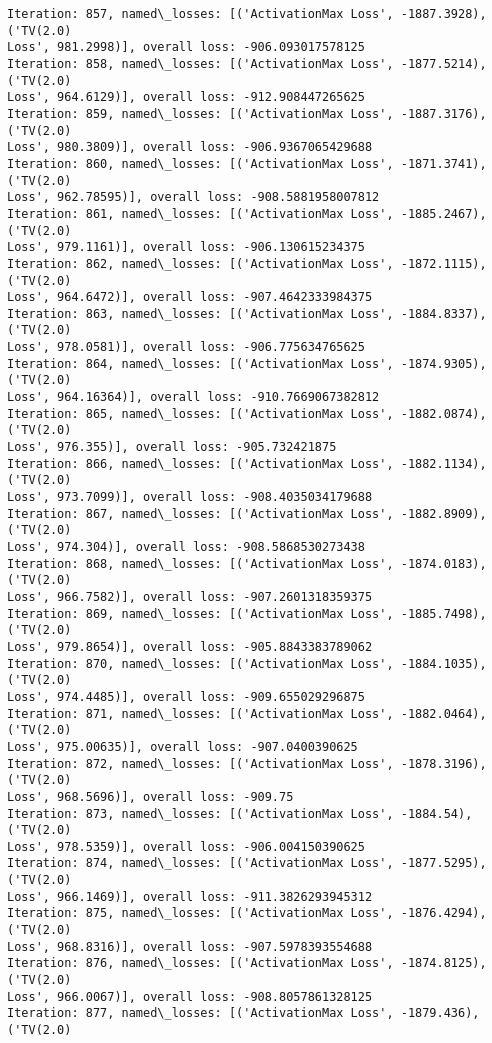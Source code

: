 \documentclass[10pt]{article}
\begin{document}
\begin{Verbatim}[commandchars=\\\{\}]
Iteration: 857, named\_losses: [('ActivationMax Loss', -1887.3928), ('TV(2.0)
Loss', 981.2998)], overall loss: -906.093017578125
Iteration: 858, named\_losses: [('ActivationMax Loss', -1877.5214), ('TV(2.0)
Loss', 964.6129)], overall loss: -912.908447265625
Iteration: 859, named\_losses: [('ActivationMax Loss', -1887.3176), ('TV(2.0)
Loss', 980.3809)], overall loss: -906.9367065429688
Iteration: 860, named\_losses: [('ActivationMax Loss', -1871.3741), ('TV(2.0)
Loss', 962.78595)], overall loss: -908.5881958007812
Iteration: 861, named\_losses: [('ActivationMax Loss', -1885.2467), ('TV(2.0)
Loss', 979.1161)], overall loss: -906.130615234375
Iteration: 862, named\_losses: [('ActivationMax Loss', -1872.1115), ('TV(2.0)
Loss', 964.6472)], overall loss: -907.4642333984375
Iteration: 863, named\_losses: [('ActivationMax Loss', -1884.8337), ('TV(2.0)
Loss', 978.0581)], overall loss: -906.775634765625
Iteration: 864, named\_losses: [('ActivationMax Loss', -1874.9305), ('TV(2.0)
Loss', 964.16364)], overall loss: -910.7669067382812
Iteration: 865, named\_losses: [('ActivationMax Loss', -1882.0874), ('TV(2.0)
Loss', 976.355)], overall loss: -905.732421875
Iteration: 866, named\_losses: [('ActivationMax Loss', -1882.1134), ('TV(2.0)
Loss', 973.7099)], overall loss: -908.4035034179688
Iteration: 867, named\_losses: [('ActivationMax Loss', -1882.8909), ('TV(2.0)
Loss', 974.304)], overall loss: -908.5868530273438
Iteration: 868, named\_losses: [('ActivationMax Loss', -1874.0183), ('TV(2.0)
Loss', 966.7582)], overall loss: -907.2601318359375
Iteration: 869, named\_losses: [('ActivationMax Loss', -1885.7498), ('TV(2.0)
Loss', 979.8654)], overall loss: -905.8843383789062
Iteration: 870, named\_losses: [('ActivationMax Loss', -1884.1035), ('TV(2.0)
Loss', 974.4485)], overall loss: -909.655029296875
Iteration: 871, named\_losses: [('ActivationMax Loss', -1882.0464), ('TV(2.0)
Loss', 975.00635)], overall loss: -907.0400390625
Iteration: 872, named\_losses: [('ActivationMax Loss', -1878.3196), ('TV(2.0)
Loss', 968.5696)], overall loss: -909.75
Iteration: 873, named\_losses: [('ActivationMax Loss', -1884.54), ('TV(2.0)
Loss', 978.5359)], overall loss: -906.004150390625
Iteration: 874, named\_losses: [('ActivationMax Loss', -1877.5295), ('TV(2.0)
Loss', 966.1469)], overall loss: -911.3826293945312
Iteration: 875, named\_losses: [('ActivationMax Loss', -1876.4294), ('TV(2.0)
Loss', 968.8316)], overall loss: -907.5978393554688
Iteration: 876, named\_losses: [('ActivationMax Loss', -1874.8125), ('TV(2.0)
Loss', 966.0067)], overall loss: -908.8057861328125
Iteration: 877, named\_losses: [('ActivationMax Loss', -1879.436), ('TV(2.0)

\end{Verbatim}
\end{document}
